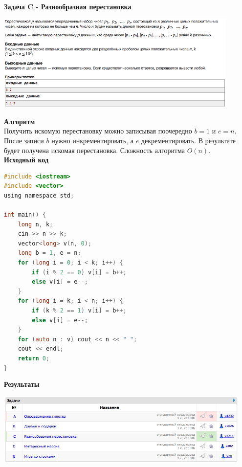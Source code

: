 \documentclass[a4paper,12pt]{article}
\begin{document}
\textbf{{\large Задача C - Разнообразная перестановка}} \\
\begin{center}
\includegraphics[width=0.9\textwidth]{C_275/C_275_C.png}\\ [1cm]
\end{center}
\textbf{{\large Алгоритм}} \\
Получить искомую перестановку можно записывая поочередно $b = 1$ и $e = n$. После записи $b$ нужно инкрементировать, а $e$ декрементировать. В результате будет получена искомая перестановка. Сложность алгоритма $O(n)$.\\

\textbf{{\large Исходный код}}
\begin{lstlisting}[language=C]
#include <iostream>
#include <vector>
using namespace std;

int main() {
    long n, k;
    cin >> n >> k;
    vector<long> v(n, 0);
    long b = 1, e = n;
    for (long i = 0; i < k; i++) {
        if (i % 2 == 0) v[i] = b++;
        else v[i] = e--;
    }
    for (long i = k; i < n; i++) {
        if (k % 2 == 1) v[i] = b++;
        else v[i] = e--;
    }
    for (auto n : v) cout << n << " ";
    cout << endl;
    return 0;
}
\end{lstlisting}

\textbf{{\large Результаты}} \\
\begin{center}
\includegraphics[width=0.95\textwidth]{C_275/C_275_result.png}\\ [1cm]
\end{center}
\end{document}
